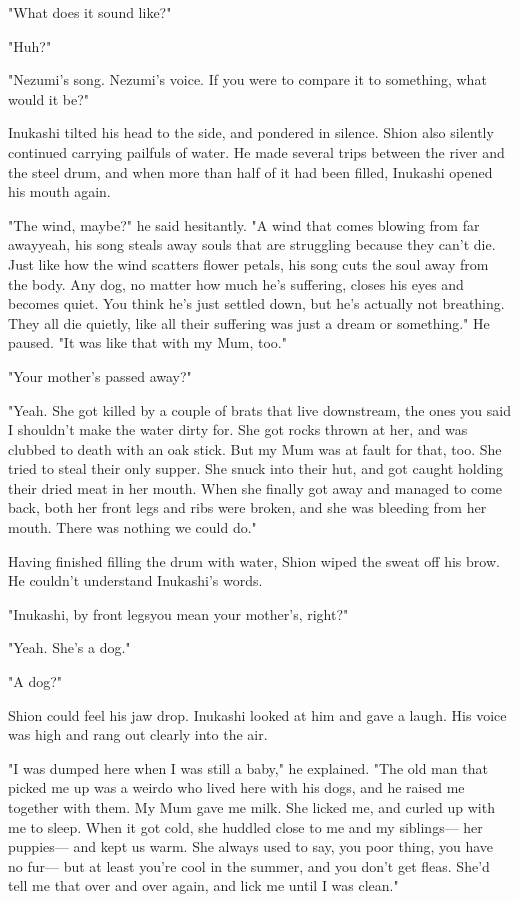"What does it sound like?"

"Huh?"

"Nezumi's song. Nezumi's voice. If you were to compare it to something,
what would it be?"

Inukashi tilted his head to the side, and pondered in silence. Shion
also silently continued carrying pailfuls of water. He made several
trips between the river and the steel drum, and when more than half of
it had been filled, Inukashi opened his mouth again.

"The wind, maybe\el ?" he said hesitantly. "A wind that comes blowing
from far away\el yeah, his song steals away souls that are struggling
because they can't die. Just like how the wind scatters flower petals,
his song cuts the soul away from the body. Any dog, no matter how much
he's suffering, closes his eyes and becomes quiet. You think he's just
settled down, but he's actually not breathing. They all die quietly,
like all their suffering was just a dream or something." He paused. "It
was like that with my Mum, too."

"Your mother's passed away?"

"Yeah. She got killed by a couple of brats that live downstream, the
ones you said I shouldn't make the water dirty for. She got rocks thrown
at her, and was clubbed to death with an oak stick. But my Mum was at
fault for that, too. She tried to steal their only supper. She snuck
into their hut, and got caught holding their dried meat in her mouth.
When she finally got away and managed to come back, both her front legs
and ribs were broken, and she was bleeding from her mouth. There was
nothing we could do."

Having finished filling the drum with water, Shion wiped the sweat off
his brow. He couldn't understand Inukashi's words.

"Inukashi, by front legs\el you mean your mother's, right?"

"Yeah. She's a dog."

"A dog?"

Shion could feel his jaw drop. Inukashi looked at him and gave a laugh.
His voice was high and rang out clearly into the air.

"I was dumped here when I was still a baby," he explained. "The old man
that picked me up was a weirdo who lived here with his dogs, and he
raised me together with them. My Mum gave me milk. She licked me, and
curled up with me to sleep. When it got cold, she huddled close to me
and my siblings--- her puppies--- and kept us warm. She always used to say,
you poor thing, you have no fur--- but at least you're cool in the summer,
and you don't get fleas. She'd tell me that over and over again, and
lick me until I was clean."

